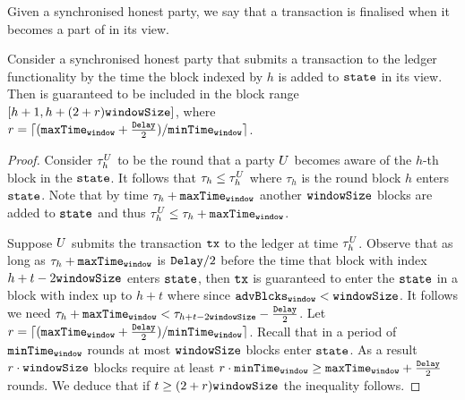   Given a synchronised honest party, we say that a transaction \tx is
  finalised when it becomes a part of \state in its view.

  \begin{proposition}
    \label{prop:tochain}
    Consider a synchronised honest party that submits a transaction \tx to the
    ledger functionality by the time the block indexed by $h$ is added to
    $\texttt{state}$ in its view. Then \tx is guaranteed to be included in the block
    range $[h+1, h + (2 + r) \texttt{windowSize}]$, where $r = \lceil (\texttt{maxTime}_\texttt{window} +
    \frac{\texttt{Delay}}{2})/ \texttt{minTime}_\texttt{window} \rceil$.
  \end{proposition}

  \begin{proof}
    Consider $\tau^{U}_h$ to be the round that a party $U$  becomes
    aware of the $h$-th block in the $\texttt{state}$. It follows that $\tau_h \leq
    \tau^{U}_h$ where $\tau_h$ is the round block $h$ enters $\texttt{state}$. Note
    that by time $\tau_h + \texttt{maxTime}_\texttt{window}$ another $\texttt{windowSize}$ blocks are added to
    $\texttt{state}$ and thus $\tau^{U}_h \leq \tau_h + \texttt{maxTime}_\texttt{window}$.

    Suppose $U$ submits the transaction $\texttt{tx}$ to the ledger at time
    $\tau^{U}_h$. Observe that as long as $\tau_h + \texttt{maxTime}_\texttt{window}$ is $\texttt{Delay}/2$
    before the time that block with index $h + t - 2\texttt{windowSize}$ enters
    $\texttt{state}$, then $\texttt{tx}$ is guaranteed to enter the $\texttt{state}$ in a block with
    index up to $h + t$ where since $\texttt{advBlcks}_\texttt{window} < \texttt{windowSize}$. It
    follows we need $\tau_h + \texttt{maxTime}_\texttt{window} < \tau_{h + t - 2\texttt{windowSize}} -
    \frac{\texttt{Delay}}{2}$. Let $r = \lceil (\texttt{maxTime}_\texttt{window} + \frac{\texttt{Delay}}{2})/ \texttt{minTime}_\texttt{window}
    \rceil$. Recall that in a period of $\texttt{minTime}_\texttt{window}$ rounds at most $\texttt{windowSize}$
    blocks enter $\texttt{state}$. As a result $r \cdot \texttt{windowSize}$ blocks require at
    least $r \cdot \texttt{minTime}_\texttt{window} \geq \texttt{maxTime}_\texttt{window} + \frac{\texttt{Delay}}{2}$ rounds. We deduce
    that if $t \geq (2 + r)\texttt{windowSize}$ the inequality follows.
  \end{proof}

